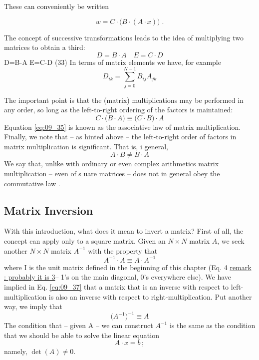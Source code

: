 These can conveniently be written

\begin{equation}
    \label{eq:09_32}
    w=C \cdot \Big( B \cdot (A \cdot x) \Big) \; .%
\end{equation}

The concept of successive transformations leads to the idea of
multiplying two matrices to obtain a third:
\begin{equation}
    \label{eq:09_33}
    D = B \cdot A \quad E = C \cdot D
\end{equation}
D=B-A E=C-D (33)
In terms of matrix elements we have, for example
\begin{equation}
    \label{eq:09_34}
    D_{ik} = \sum_{j=0}^{N-1} B_{ij} A_{jk}
\end{equation}

The important point is that the (matrix) multiplications may be
performed in any order, so long as the left-to-right ordering of
the factors is maintained:
\begin{equation}
    \label{eq:09_35}
    C \cdot \big( B \cdot A \big) \equiv \big( C \cdot B \big) \cdot A
\end{equation}
Equation \ref{eq:09_35} is known as the associative law of matrix
multiplication. Finally, we note that -- as hinted above -- the left-to-right
order of factors in matrix multiplication is significant. That is, i
general,
\begin{equation}
    \label{eq:09_36}
    A \cdot B \neq B \cdot A
\end{equation}
We say that, unlike with ordinary or even complex arithmetics
matrix multiplication -- even of s uare matrices -- does not in
general obey the commutative law .

\subsection{Matrix Inversion}
With this introduction, what does it mean to invert a matrix? First
of all, the concept can apply only to a square matrix. Given an
$N \times N$ matrix $A$, we seek another $N \times N$ matrix $A^{-1}$ with the property that
\begin{equation}
    \label{eq:09_37}
    A^{-1} \cdot A \equiv A \cdot A^{-1}
\end{equation} 
where I is the unit matrix defined in the beginning of this chapter
(Eq. 4  \underline{remark : probably it is 3}-- 1's on the main diagonal, 0's everywhere else). We have
implied in Eq. \ref{eq:09_37} that a matrix that is an inverse with respect to
left-multiplication is also an inverse with respect to right-multiplication. Put another way, we imply that
\begin{equation}
    \label{eq:09_38}
    \Big(A^{-1} \Big)^{-1} \equiv A
\end{equation} 
The condition that -- given A -- we can construct $A^{-1}$ is the same
as the condition that we should be able to solve the linear equation
\begin{equation*}
    A \cdot x = b \,;
\end{equation*} 
 namely, $\det(A) \neq 0$.

